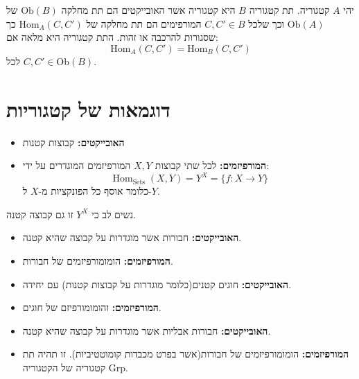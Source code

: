 \documentclass{tstextbook}
\begin{document}
\begin{definition}[תת קטגוריה]
יהי \(A\) קטגוריה. תת קטגוריה \(B\) היא קטגוריה אשר האובייקטים הם תת מחלקה \(\mathrm{Ob}(B)\) של \(\mathrm{Ob}(A)\) וכך שלכל \(C,C' \in B\) המורפימים הם תת מחלקה של \(\mathrm{Hom}_{A}(C,C')\) כך שסגורות להרכבה או זהות. התת קטגוריה היא מלאה אם:
$$\mathrm{Hom}_{A}(C,C')=\mathrm{Hom}_{B}(C,C')$$
לכל \(C,C'\in \mathrm{Ob}(B)\).

\end{definition}
\section{דוגמאות של קטגוריות}

\begin{definition}
  \begin{itemize}
    \item \textbf{האובייקטים:} קבוצות קטנות
    \item \textbf{המורפיזמים:} לכל שתי קבוצות \(X,Y\) המורפיזמים המוגדרים על ידי:
$$\operatorname{Hom}_{\operatorname{Sets}}(X,Y)=Y^{X}=\{f:X\to Y\}$$
כלומר אוסף כל הפונקציות מ-\(X\) ל-\(Y\).
  \end{itemize}
\end{definition}
\begin{remark}
נשים לב כי \(Y^{X}\) זו גם קבוצה קטנה.

\end{remark}
\begin{definition}
  \begin{itemize}
    \item \textbf{האובייקטים:} חבורות אשר מוגדרות על קבוצה שהיא קטנה.
    \item \textbf{המורפיזמים:} הומומורפיזמים של חבורות.
  \end{itemize}
\end{definition}
\begin{definition}
  \begin{itemize}
    \item \textbf{האובייקטים:} חוגים קטנים(כלומר מוגדרות על קבוצות קטנות) עם יחידה.
    \item \textbf{המורפיזמים:} והומומורפיזם של חוגים.
  \end{itemize}
\end{definition}
\begin{definition}
  \begin{itemize}
    \item \textbf{האובייקטים:} חבורות אבליות אשר מוגדרות על קבוצה שהיא קטנה.
    \item \textbf{המורפיזמים:} הומומורפיזמים של חבורות(אשר בפרט מכבדות קומוטטיביות).
זו תהיה תת קטגוריה של הקטגוריה \(\mathrm{Grp}\).
  \end{itemize}
\end{definition}
\end{document}
